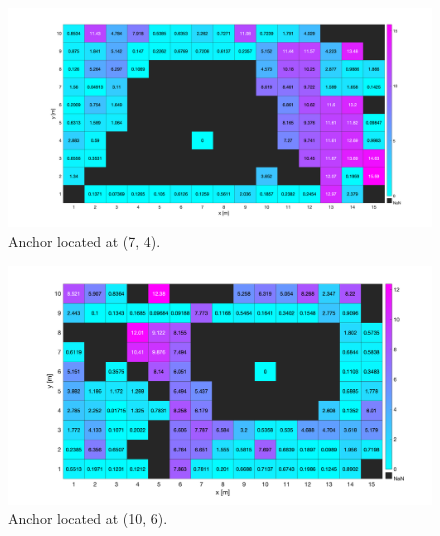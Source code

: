 \begin{figure}[H]
\centering
\includegraphics[width=.9\linewidth]{Images/hla_images/hla_anchor_(7_4)_clut.png}
\caption{Anchor located at (7, 4).}
\end{figure}

\begin{figure}[H]
\centering
\includegraphics[width=.9\linewidth]{Images/hla_images/hla_anchor_(10_6)_clut.png}
\caption{Anchor located at (10, 6).}
\end{figure}
